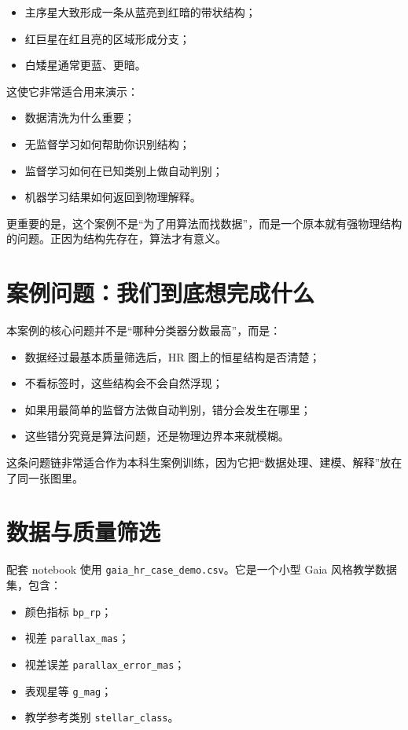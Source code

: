 \begin{itemize}
    \item 主序星大致形成一条从蓝亮到红暗的带状结构；
    \item 红巨星在红且亮的区域形成分支；
    \item 白矮星通常更蓝、更暗。
\end{itemize}

这使它非常适合用来演示：

\begin{itemize}
    \item 数据清洗为什么重要；
    \item 无监督学习如何帮助你识别结构；
    \item 监督学习如何在已知类别上做自动判别；
    \item 机器学习结果如何返回到物理解释。
\end{itemize}

更重要的是，这个案例不是“为了用算法而找数据”，而是一个原本就有强物理结构的问题。正因为结构先存在，算法才有意义。

\section{案例问题：我们到底想完成什么}

本案例的核心问题并不是“哪种分类器分数最高”，而是：

\begin{itemize}
    \item 数据经过最基本质量筛选后，HR 图上的恒星结构是否清楚；
    \item 不看标签时，这些结构会不会自然浮现；
    \item 如果用最简单的监督方法做自动判别，错分会发生在哪里；
    \item 这些错分究竟是算法问题，还是物理边界本来就模糊。
\end{itemize}

这条问题链非常适合作为本科生案例训练，因为它把“数据处理、建模、解释”放在了同一张图里。

\section{数据与质量筛选}

配套 notebook 使用 \nolinkurl{gaia_hr_case_demo.csv}。它是一个小型 Gaia 风格教学数据集，包含：

\begin{itemize}
    \item 颜色指标 \texttt{bp\_rp}；
    \item 视差 \texttt{parallax\_mas}；
    \item 视差误差 \texttt{parallax\_error\_mas}；
    \item 表观星等 \texttt{g\_mag}；
    \item 教学参考类别 \texttt{stellar\_class}。
\end{itemize}

